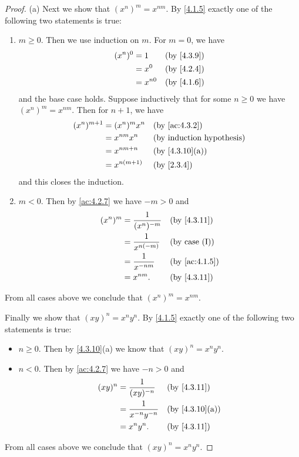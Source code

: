 \begin{proof}{(a)}
  Next we show that \((x^n)^m = x^{nm}\).
  By \cref{4.1.5} exactly one of the following two statements is true:
  \begin{enumerate}[label=(\Roman*)]
    \item \(m \geq 0\).
          Then we use induction on \(m\).
          For \(m = 0\), we have
          \begin{align*}
            (x^n)^0 & = 1      &  & \by{4.3.9} \\
                    & = x^0    &  & \by{4.2.4} \\
                    & = x^{n0} &  & \by{4.1.6}
          \end{align*}
          and the base case holds.
          Suppose inductively that for some \(n \geq 0\) we have \((x^n)^m = x^{nm}\).
          Then for \(n + 1\), we have
          \begin{align*}
            (x^n)^{m + 1} & = (x^n)^m x^n  &  & \by{ac:4.3.2}                \\
                          & = x^{nm} x^n   &  & \byIH                        \\
                          & = x^{nm + n}   &  & \text{(by \cref{4.3.10}(a))} \\
                          & = x^{n(m + 1)} &  & \by{2.3.4}
          \end{align*}
          and this closes the induction.
    \item \(m < 0\).
          Then by \cref{ac:4.2.7} we have \(-m > 0\) and
          \begin{align*}
            (x^n)^m & = \dfrac{1}{(x^n)^{-m}} &  & \by{4.3.11}          \\
                    & = \dfrac{1}{x^{n(-m)}}  &  & \text{(by case (I))} \\
                    & = \dfrac{1}{x^{-nm}}    &  & \by{ac:4.1.5}        \\
                    & = x^{nm}.               &  & \by{4.3.11}
          \end{align*}
  \end{enumerate}
  From all cases above we conclude that \((x^n)^m = x^{nm}\).

  Finally we show that \((xy)^n = x^n y^n\).
  By \cref{4.1.5} exactly one of the following two statements is true:
  \begin{itemize}
    \item \(n \geq 0\).
          Then by \cref{4.3.10}(a) we know that \((xy)^n = x^n y^n\).
    \item \(n < 0\).
          Then by \cref{ac:4.2.7} we have \(-n > 0\) and
          \begin{align*}
            (xy)^n & = \dfrac{1}{(xy)^{-n}}     &  & \by{4.3.11}                  \\
                   & = \dfrac{1}{x^{-n} y^{-n}} &  & \text{(by \cref{4.3.10}(a))} \\
                   & = x^n y^n.                 &  & \by{4.3.11}
          \end{align*}
  \end{itemize}
  From all cases above we conclude that \((xy)^n = x^n y^n\).
\end{proof}

